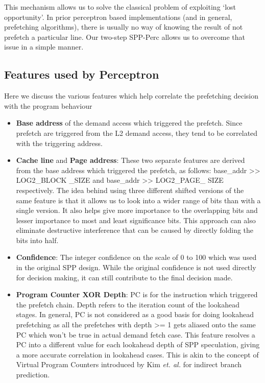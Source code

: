 This mechanism allows us to solve the classical problem of exploiting
`lost opportunity'.  In prior perceptron based implementations (and in
general, prefetching algorithms), there is usually no way of knowing
the result of not prefetch a particular line.  Our two-step SPP-Perc
allows us to overcome that issue in a simple manner.

\subsection{Features used by Perceptron}

Here we discuss the various features which help correlate the
prefetching decision with the program behaviour
\begin{itemize}
\item \textbf{Base address} of the demand access which triggered the
  prefetch.  Since prefetch are triggered from the L2 demand access,
  they tend to be correlated with the triggering address.

\item \textbf{Cache line} and \textbf{Page address}: These two
  separate features are derived from the base address which triggered
  the prefetch, as follows: base\_addr >> LOG2\_BLOCK \_SIZE and
  base\_addr >> LOG2\_PAGE\_ SIZE respectively.  The idea behind using
  three different shifted versions of the same feature is that it
  allows us to look into a wider range of bits than with a single
  version.  It also helps give more importance to the overlapping bits
  and lesser importance to most and least significance bits.  This
  approach can also eliminate destructive interference that can be
  caused by directly folding the bits into half.

\item \textbf{Confidence}: The integer confidence on the scale of 0 to
  100 which was used in the original SPP design.  While the original
  confidence is not used directly for decision making, it can still
  contribute to the final decision made.

\item \textbf{Program Counter XOR Depth}: PC is for the instruction
  which triggered the prefetch chain.  Depth refers to the iteration
  count of the lookahead stages.  In general, PC is not considered as
  a good basis for doing lookahead prefetching as all the prefetches
  with depth >= 1 gets aliased onto the same PC which won't be true in
  actual demand fetch case.  This feature resolves a PC into a
  different value for each lookahead depth of SPP speculation, giving
  a more accurate correlation in lookahead cases.  This is akin to the
  concept of Virtual Program Counters\cite{VPC} introduced by Kim
  \textit{et. al.} for indirect branch prediction.



\end{itemize}
